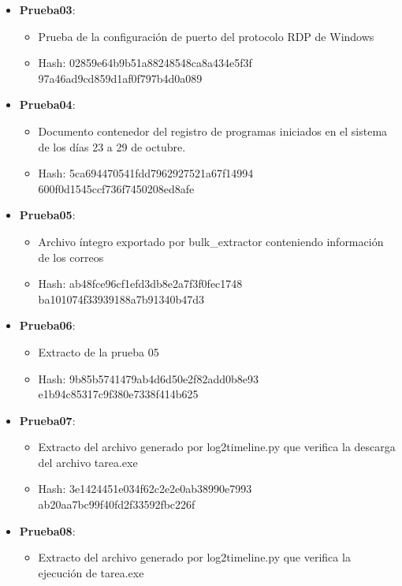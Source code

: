 \begin{itemize}
  \item{\textbf{Prueba03}: 
    \begin{itemize}
      \item{Prueba de la configuración de puerto del protocolo \gls{RDP} de Windows}
      \item{Hash}: 02859e64b9b51a88248548ca8a434e5f3f\\97a46ad9cd859d1af0f797b4d0a089
    \end{itemize}}
  \item{\textbf{Prueba04}: 
    \begin{itemize}
      \item{Documento contenedor del registro de programas iniciados en el sistema de los días 23 a 29 de octubre.}
      \item{Hash}: 5ca694470541fdd7962927521a67f14994\\600f0d1545ccf736f7450208ed8afe
    \end{itemize}}
  \item{\textbf{Prueba05}: 
    \begin{itemize}
      \item{Archivo íntegro exportado por bulk\_extractor conteniendo información de los correos}
      \item{Hash}: ab48fce96cf1efd3db8e2a7f3f0fec1748\\ba101074f33939188a7b91340b47d3
    \end{itemize}}
  \item{\textbf{Prueba06}: 
    \begin{itemize}
      \item{Extracto de la prueba 05}
      \item{Hash}: 9b85b5741479ab4d6d50e2f82add0b8e93\\e1b94c85317c9f380e7338f414b625
    \end{itemize}}
  \item{\textbf{Prueba07}: 
    \begin{itemize}
      \item{Extracto del archivo generado por log2timeline.py que verifica la descarga del archivo tarea.exe}
      \item{Hash}: 3e1424451e034f62c2e2e0ab38990e7993\\ab20aa7bc99f40fd2f33592fbc226f
    \end{itemize}}
  \item{\textbf{Prueba08}: 
    \begin{itemize}
      \item{Extracto del archivo generado por log2timeline.py que verifica la ejecución de tarea.exe}

\end{itemize}}
\end{itemize}
